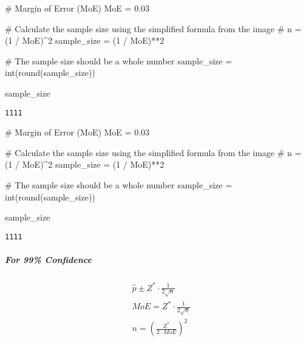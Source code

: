 \documentclass[
  letterpaper,
  DIV=11,
  numbers=noendperiod]{scrartcl}
\let\oldsubparagraph\subparagraph
\renewcommand{\subparagraph}[1]{\oldsubparagraph{#1}\mbox{}}
\newenvironment{Shaded}{\begin{snugshade}}{\end{snugshade}}
\newcommand{\BuiltInTok}[1]{\textcolor[rgb]{0.00,0.23,0.31}{#1}}
\newcommand{\CommentTok}[1]{\textcolor[rgb]{0.37,0.37,0.37}{#1}}
\newcommand{\DecValTok}[1]{\textcolor[rgb]{0.68,0.00,0.00}{#1}}
\newcommand{\FloatTok}[1]{\textcolor[rgb]{0.68,0.00,0.00}{#1}}
\newcommand{\NormalTok}[1]{\textcolor[rgb]{0.00,0.23,0.31}{#1}}
\newcommand{\OperatorTok}[1]{\textcolor[rgb]{0.37,0.37,0.37}{#1}}
\begin{document}
\begin{Shaded}
\begin{Highlighting}[]
\CommentTok{\# Margin of Error (MoE)}
\NormalTok{MoE }\OperatorTok{=} \FloatTok{0.03}

\CommentTok{\# Calculate the sample size using the simplified formula from the image}
\CommentTok{\# n = (1 / MoE)\^{}2}
\NormalTok{sample\_size }\OperatorTok{=}\NormalTok{ (}\DecValTok{1} \OperatorTok{/}\NormalTok{ MoE)}\OperatorTok{**}\DecValTok{2}

\CommentTok{\# The sample size should be a whole number}
\NormalTok{sample\_size }\OperatorTok{=} \BuiltInTok{int}\NormalTok{(}\BuiltInTok{round}\NormalTok{(sample\_size))}

\NormalTok{sample\_size}
\end{Highlighting}
\end{Shaded}

\begin{verbatim}
1111
\end{verbatim}

\begin{Shaded}
\begin{Highlighting}[]
\CommentTok{\# Margin of Error (MoE)}
\NormalTok{MoE }\OperatorTok{=} \FloatTok{0.03}

\CommentTok{\# Calculate the sample size using the simplified formula from the image}
\CommentTok{\# n = (1 / MoE)\^{}2}
\NormalTok{sample\_size }\OperatorTok{=}\NormalTok{ (}\DecValTok{1} \OperatorTok{/}\NormalTok{ MoE)}\OperatorTok{**}\DecValTok{2}

\CommentTok{\# The sample size should be a whole number}
\NormalTok{sample\_size }\OperatorTok{=} \BuiltInTok{int}\NormalTok{(}\BuiltInTok{round}\NormalTok{(sample\_size))}

\NormalTok{sample\_size}
\end{Highlighting}
\end{Shaded}

\begin{verbatim}
1111
\end{verbatim}

\hypertarget{for-99-confidence}{%
\subparagraph{For 99\% Confidence}\label{for-99-confidence}}

\[
\begin{align*}
& \hat{p} \pm Z^* \cdot \frac{1}{2\sqrt{n}} \\
& MoE = Z^* \cdot \frac{1}{2\sqrt{n}} \\
& n = \left( \frac{Z^*}{2 \cdot MoE} \right)^2 \\
\end{align*}
\]
\end{document}
